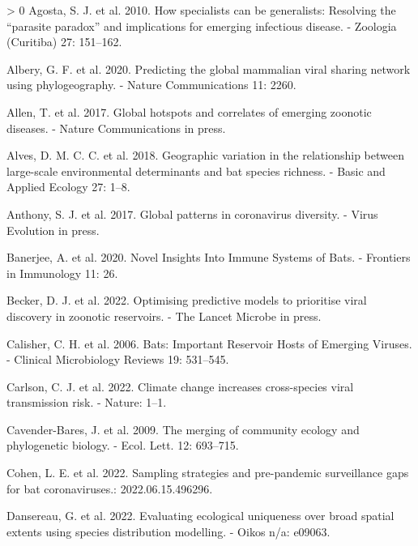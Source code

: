 \documentclass[11pt]{article}
\newlength{\cslhangindent}
\newenvironment{CSLReferences}[3] %
 {%
  \setlength{\parindent}{0pt}
  \ifodd #1 \everypar{\setlength{\hangindent}{\cslhangindent}}\ignorespaces\fi
  \ifnum #2 > 0
  \setlength{\parskip}{#2\baselineskip}
  \fi
 }%
 {}
\begin{document}
\hypertarget{refs}{}
\begin{CSLReferences}{1}{0}
\leavevmode\hypertarget{ref-Agosta2010HowSpe}{}%
Agosta, S. J. et al. 2010. How specialists can be generalists: Resolving
the {``parasite paradox''} and implications for emerging infectious
disease. - Zoologia (Curitiba) 27: 151--162.

\leavevmode\hypertarget{ref-Albery2020PreGlo}{}%
Albery, G. F. et al. 2020. Predicting the global mammalian viral sharing
network using phylogeography. - Nature Communications 11: 2260.

\leavevmode\hypertarget{ref-Allen2017GloHot}{}%
Allen, T. et al. 2017. Global hotspots and correlates of emerging
zoonotic diseases. - Nature Communications in press.

\leavevmode\hypertarget{ref-Alves2018GeoVar}{}%
Alves, D. M. C. C. et al. 2018. Geographic variation in the relationship
between large-scale environmental determinants and bat species richness.
- Basic and Applied Ecology 27: 1--8.

\leavevmode\hypertarget{ref-Anthony2017GloPat}{}%
Anthony, S. J. et al. 2017. Global patterns in coronavirus diversity. -
Virus Evolution in press.

\leavevmode\hypertarget{ref-Banerjee2020NovIns}{}%
Banerjee, A. et al. 2020. Novel Insights Into Immune Systems of Bats. -
Frontiers in Immunology 11: 26.

\leavevmode\hypertarget{ref-Becker2022OptPre}{}%
Becker, D. J. et al. 2022. Optimising predictive models to prioritise
viral discovery in zoonotic reservoirs. - The Lancet Microbe in press.

\leavevmode\hypertarget{ref-Calisher2006BatImp}{}%
Calisher, C. H. et al. 2006. Bats: Important Reservoir Hosts of Emerging
Viruses. - Clinical Microbiology Reviews 19: 531--545.

\leavevmode\hypertarget{ref-Carlson2022CliCha}{}%
Carlson, C. J. et al. 2022. Climate change increases cross-species viral
transmission risk. - Nature: 1--1.

\leavevmode\hypertarget{ref-Cavender-Bares2009MerCom}{}%
Cavender-Bares, J. et al. 2009. The merging of community ecology and
phylogenetic biology. - Ecol. Lett. 12: 693--715.

\leavevmode\hypertarget{ref-Cohen2022SamStr}{}%
Cohen, L. E. et al. 2022. Sampling strategies and pre-pandemic
surveillance gaps for bat coronaviruses.: 2022.06.15.496296.

\leavevmode\hypertarget{ref-Dansereau2022EvaEco}{}%
Dansereau, G. et al. 2022. Evaluating ecological uniqueness over broad
spatial extents using species distribution modelling. - Oikos n/a:
e09063.


\end{CSLReferences}
\end{document}

